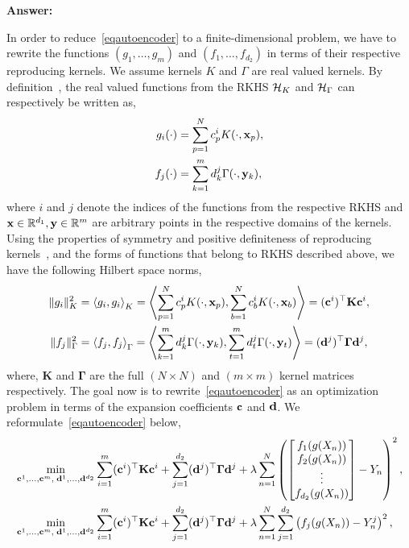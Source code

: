 
{\bf Answer:}

In order to reduce~\eqref{eqautoencoder} to a finite-dimensional problem, we have to rewrite the functions $(g_1,\dots,g_m)$ and $(f_1,\dots,f_{d_2})$ in terms of their respective reproducing kernels. We assume kernels $K$ and $\Gamma$ are real valued kernels. By definition~\cite[Chapter 2.3]{fasshauer2015kernel}, the real valued functions from the RKHS $\mathcal{H}_K$ and $\mathcal{H}_\Gamma$ can respectively be written as,
\begin{align}
g_i(\cdot) &= \sum\limits_{p=1}^{N} c^i_p K(\cdot, \mathbf{x}_p), \\
f_j(\cdot) &= \sum\limits_{k=1}^{m} d^j_k \Gamma(\cdot, \mathbf{y}_k),
\end{align}
where $i$ and $j$ denote the indices of the functions from the respective RKHS and $\mathbf{x} \in \mathbb{R}^{d_1}, \mathbf{y} \in \mathbb{R}^m$ are arbitrary points in the respective domains of the kernels. Using the properties of symmetry and positive definiteness of reproducing kernels~\cite[Chapter 2.3]{fasshauer2015kernel}, and the forms of functions that belong to RKHS described above, we have the following Hilbert space norms,
\begin{align}
\|g_i\|_K^2 &= \left\langle g_i, g_i \right\rangle_K = \left\langle \sum\limits_{p=1}^{N} c^i_p K(\cdot, \mathbf{x}_p), \sum\limits_{b=1}^{N} c^i_b K(\cdot, \mathbf{x}_b) \right\rangle =  (\mathbf{c}^i)^\top \mathbf{K} \mathbf{c}^i, \\
\|f_j\|_\Gamma^2 &= \left\langle f_j, f_j \right\rangle_{\Gamma} = \left\langle \sum\limits_{k=1}^{m} d^j_k \Gamma(\cdot, \mathbf{y}_k), \sum\limits_{t=1}^{m} d^j_t \Gamma(\cdot, \mathbf{y}_t) \right\rangle =  (\mathbf{d}^j)^\top \mathbf{\Gamma} \mathbf{d}^j,
\end{align}
where, $\mathbf{K}$ and $\mathbf{\Gamma}$ are the full $(N\times N)$ and $(m\times m)$ kernel matrices respectively. The goal now is to rewrite~\eqref{eqautoencoder} as an optimization problem in terms of the expansion coefficients $\mathbf{c}$ and $\mathbf{d}$. We reformulate~\eqref{eqautoencoder} below,
\begin{align}
&\min_{\mathbf{c}^1,\ldots,\mathbf{c}^m,\; \mathbf{d}^1,\ldots,\mathbf{d}^{d_2}} 
\sum_{i=1}^m (\mathbf{c}^i)^\top \mathbf{K} \mathbf{c}^i
+ \sum_{j=1}^{d_2} (\mathbf{d}^j)^\top \mathbf{\Gamma} \mathbf{d}^j
+ \lambda \sum\limits_{n=1}^{N} \left( \begin{bmatrix}
f_1(g(X_n)) \\ 
f_2(g(X_n)) \\ 
\vdots \\
f_{d_2}(g(X_n))
\end{bmatrix} - Y_n \right)^2, \\
&\min_{\mathbf{c}^1,\ldots,\mathbf{c}^m,\; \mathbf{d}^1,\ldots,\mathbf{d}^{d_2}} 
\sum_{i=1}^m (\mathbf{c}^i)^\top \mathbf{K} \mathbf{c}^i
+ \sum_{j=1}^{d_2} (\mathbf{d}^j)^\top \mathbf{\Gamma} \mathbf{d}^j
+ \lambda \sum\limits_{n=1}^N \sum\limits_{j=1}^{d_2} \left( f_j(g(X_n)) - Y^j_n \right)^2, \label{eq:sumexpansion}
\end{align}
